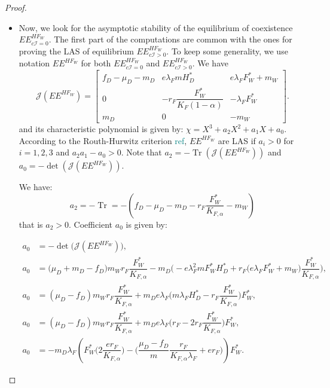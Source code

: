 \documentclass{article}
\newcommand{\lfw}{\lambda_{F}}
\newcommand{\lfw}{\lambda_{F}}
\newcommand{\cI}{c \mathcal{I}}
\newcommand{\marc}[1]{\textcolor{teal}{#1}}
\DeclareMathOperator{\Tr}{Tr}
\begin{document}
\begin{proof}
\begin{itemize}
\item Now, we look for the asymptotic stability of the equilibrium of coexistence $EE^{HF_W}_{\cI=0}$. The first part of the computations are common with the ones for proving the LAS of equilibrium $EE^{HF_W}_{\cI >0}$.   To keep some generality, we use notation $EE^{HF_W}$ for both $EE^{HF_W}_{\cI =0}$ and $EE^{HF_W}_{\cI >0}$. We have 
\begin{equation*}
\mathcal{J}(EE^{H F_W}) = \begin{bmatrix}
f_D -\mu_D - m_D & e \lfw m H_D^* & e \lfw F^*_W +m_W \\
0 & -r_F \dfrac{F_W^*}{K_F(1-\alpha)} & - \lfw F_W^* \\
m_D & 0 & -m_W
\end{bmatrix}.
\end{equation*} and its characteristic polynomial is given by: $\chi = X^3 + a_2 X^2 + a_1 X + a_0$. According to the Routh-Hurwitz criterion \marc{ref}, $EE^{H F_W}$ are LAS if $a_i > 0$ for $i=1,2,3$ and $a_2 a_1 - a_0 > 0$. Note that $a_2 = - \Tr(\mathcal{J}(EE^{H F_W}))$ and $a_0 = - \det (\mathcal{J}(EE^{H F_W}))$.

We have:
\begin{equation}\label{expressionA2}
a_2 = - \Tr = -(f_D - \mu_D - m_D - r_F \dfrac{F_W^*}{K_{F, \alpha}} - m_W)
\end{equation}
that is $a_2>0$. Coefficient $a_0$ is given by:

\begin{subequations}
\begin{align}
a_0 &= -\det\Big(\mathcal{J}(EE^{H F_W})\Big), \\
a_0 &= \Big(\mu_D + m_D -f_D \Big) m_W r_F \dfrac{F^*_W}{K_{F, \alpha}} - m_D\Big(-e\lfw ^2 m F_W^* H_D^* + r_F \big(e \lfw F^*_W + m_W \big) \dfrac{F^*_W}{K_{F, \alpha}} \Big), \\
a_0 &= (\mu_D-f_D) m_W r_F \dfrac{F^*_W}{K_{F, \alpha}} + m_D e \lfw \Big( m \lfw H_D^* - r_F \dfrac{F^*_W}{K_{F, \alpha}} \Big) F^*_W, \\
a_0 &= (\mu_D-f_D) m_W r_F \dfrac{F^*_W}{K_{F, \alpha}} + m_D e \lfw \Big( r_F - 2 r_F \dfrac{F^*_W}{K_{F, \alpha}} \Big) F^*_W, \\
a_0 &= - m_D \lfw \left( F_W^* \Big(2 \dfrac{e r_F}{K_{F, \alpha}} \Big) - \Big(\dfrac{\mu_D - f_D}{m} \dfrac{r_F}{K_{F, \alpha} \lfw} + er_F \Big) \right) F_W^*. \label{expressionA0}
\end{align}
\end{subequations}


\end{itemize}
\end{proof}
\end{document}
